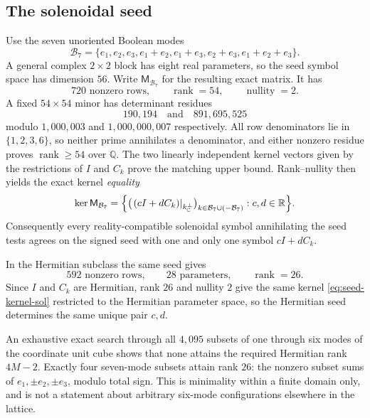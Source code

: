 \documentclass[11pt]{article}
\theoremstyle{definition}
\theoremstyle{remark}
\theoremstyle{plain}
\DeclareMathOperator{\rank}{rank}
\DeclareMathOperator{\nullity}{nullity}
\newcommand{\R}{\mathbb{R}}
\newcommand{\C}{\mathbb{C}}
\newcommand{\Q}{\mathbb{Q}}
\newcommand{\Ck}{C_k}
\newcommand{\kperp}{k_{\C}^{\perp}}
\begin{document}
\subsection{The solenoidal seed}
\label{subsec:solseed}

Use the seven unoriented Boolean modes
\begin{equation}
\label{eq:boolean}
\mathcal B_{7}=
\{e_{1},e_{2},e_{3},e_{1}+e_{2},e_{1}+e_{3},e_{2}+e_{3},e_{1}+e_{2}+e_{3}\}.
\end{equation}
A general complex $2\times2$ block has eight real parameters, so the seed
symbol space has dimension $56$. Write $\mathsf M_{\mathcal B_{7}}$ for the
resulting exact matrix. It has
\begin{equation}
\label{eq:solseedrank}
720\text{ nonzero rows},
\qquad
\rank=54,
\qquad
\nullity=2 .
\end{equation}
A fixed $54\times54$ minor has determinant residues
\begin{equation}
\label{eq:solminor}
190{,}194
\quad\text{and}\quad
891{,}695{,}525
\end{equation}
modulo $1{,}000{,}003$ and $1{,}000{,}000{,}007$ respectively. All row
denominators lie in $\{1,2,3,6\}$, so neither prime annihilates a denominator,
and either nonzero residue proves $\rank\ge54$ over $\Q$. The two linearly
independent kernel vectors given by the restrictions of $I$ and $\Ck$ prove the
matching upper bound. Rank--nullity then yields the exact kernel
\emph{equality}
\begin{equation}
\label{eq:seed-kernel-sol}
\ker\mathsf M_{\mathcal B_{7}}
=\Bigl\{
\bigl(\left.(cI+d\Ck)\right|_{\kperp}\bigr)_{k\in\mathcal B_{7}\cup(-\mathcal B_{7})}
:c,d\in\R
\Bigr\}.
\end{equation}
Consequently every reality-compatible solenoidal symbol annihilating the seed
tests agrees on the signed seed with one and only one symbol $cI+d\Ck$.

In the Hermitian subclass the same seed gives
\begin{equation}
\label{eq:hermseed}
592\text{ nonzero rows},
\qquad
28\text{ parameters},
\qquad
\rank=26 .
\end{equation}
Since $I$ and $\Ck$ are Hermitian, rank $26$ and nullity $2$ give the same
kernel \eqref{eq:seed-kernel-sol} restricted to the Hermitian parameter space,
so the Hermitian seed determines the same unique pair $c,d$.

An exhaustive exact search through all $4{,}095$ subsets of one through six
modes of the coordinate unit cube shows that none attains the required
Hermitian rank $4M-2$. Exactly four seven-mode subsets attain rank $26$: the
nonzero subset sums of $e_{1},\pm e_{2},\pm e_{3}$, modulo total sign. This is
minimality within a finite domain only, and is not a statement about arbitrary
six-mode configurations elsewhere in the lattice.
\end{document}
